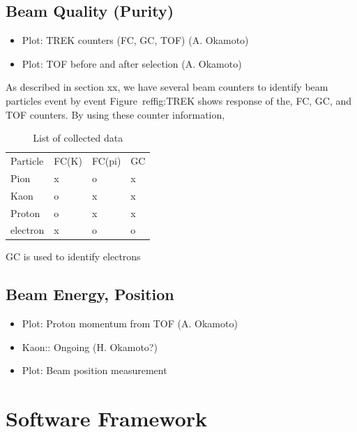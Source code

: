 \documentclass{cernyrep}
\begin{document}
\subsection{Beam Quality (Purity)}
\begin{itemize}
\item Plot: TREK counters (FC, GC, TOF) (A. Okamoto)
\item Plot: TOF before and after selection  (A. Okamoto)
\end{itemize}

 As described in section xx, we have several beam counters
to identify beam particles event by event
Figure~ref{fig:TREK} shows response of the, FC, GC, and TOF counters.
By using these counter information,

\begin{table}[h]
\begin{tabular}{llll}
  Particle  &FC(K) &FC(pi) &GC\\
  Pion      &x     &o      &x\\
  Kaon      &o     &x      &x\\
  Proton    &o     &x      &x\\
  electron  &x     &o      &o\\

\end{tabular}
\caption{List of collected data}
\label{Table:Data}
\end{table}


GC is used to identify electrons



 

\subsection{Beam Energy, Position}
\begin{itemize}
\item Plot: Proton momentum from TOF  (A. Okamoto)
\item Kaon:: Ongoing  (H. Okamoto?)
\item Plot: Beam position measurement
\end{itemize}

\section{Software Framework}

\end{document}
